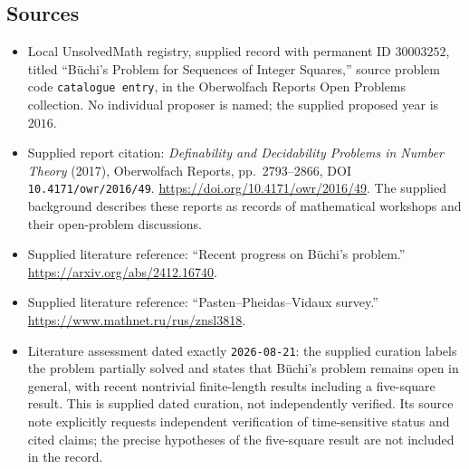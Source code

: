 \documentclass[11pt]{article}
\begin{document}
\subsection{Sources}
\begin{itemize}
\item Local UnsolvedMath registry, supplied record with permanent ID \(30003252\), titled ``Büchi's Problem for Sequences of Integer Squares,'' source problem code \texttt{catalogue entry}, in the Oberwolfach Reports Open Problems collection. No individual proposer is named; the supplied proposed year is \(2016\).
\item Supplied report citation: \emph{Definability and Decidability Problems in Number Theory} (2017), Oberwolfach Reports, pp.~2793--2866, DOI \texttt{10.4171/owr/2016/49}. \url{https://doi.org/10.4171/owr/2016/49}. The supplied background describes these reports as records of mathematical workshops and their open-problem discussions.
\item Supplied literature reference: ``Recent progress on Büchi's problem.'' \url{https://arxiv.org/abs/2412.16740}.
\item Supplied literature reference: ``Pasten--Pheidas--Vidaux survey.'' \url{https://www.mathnet.ru/rus/znsl3818}.
\item Literature assessment dated exactly \texttt{2026-08-21}: the supplied curation labels the problem partially solved and states that Büchi's problem remains open in general, with recent nontrivial finite-length results including a five-square result. This is supplied dated curation, not independently verified. Its source note explicitly requests independent verification of time-sensitive status and cited claims; the precise hypotheses of the five-square result are not included in the record.
\end{itemize}
\end{document}
